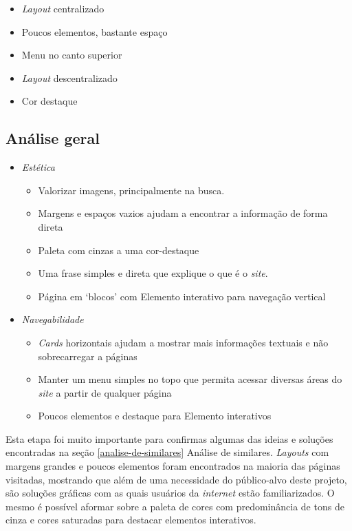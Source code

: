 \begin{itemize}
\tightlist
\item
  \emph{Layout} centralizado
\item
  Poucos elementos, bastante espaço
\item
  Menu no canto superior
\item
  \emph{Layout} descentralizado
\item
  Cor destaque
\end{itemize}

\subsection{Análise geral}\label{analise-geral-1}

\begin{itemize}
\tightlist
\item
  \emph{Estética}

  \begin{itemize}
  \tightlist
  \item
    Valorizar imagens, principalmente na busca.
  \item
    Margens e espaços vazios ajudam a encontrar a informação de forma direta
  \item
    Paleta com cinzas a uma cor-destaque
  \item
    Uma frase simples e direta que explique o que é o \emph{site}.
  \item
    Página em `blocos' com Elemento interativo para navegação vertical
  \end{itemize}
\item
  \emph{Navegabilidade}

  \begin{itemize}
  \tightlist
  \item
    \emph{Cards} horizontais ajudam a mostrar mais informações textuais e não sobrecarregar a páginas
  \item
    Manter um menu simples no topo que permita acessar diversas áreas do \emph{site} a partir de qualquer página
  \item
    Poucos elementos e destaque para Elemento interativos
  \end{itemize}
\end{itemize}

Esta etapa foi muito importante para confirmas algumas das ideias e soluções encontradas na seção \ref{analise-de-similares} Análise de similares. \emph{Layouts} com margens grandes e poucos elementos foram encontrados na maioria das páginas visitadas, mostrando que além de uma necessidade do público-alvo deste projeto, são soluções gráficas com as quais usuários da \emph{internet} estão familiarizados. O mesmo é possível aformar sobre a paleta de cores com predominância de tons de cinza e cores saturadas para destacar elementos interativos.

